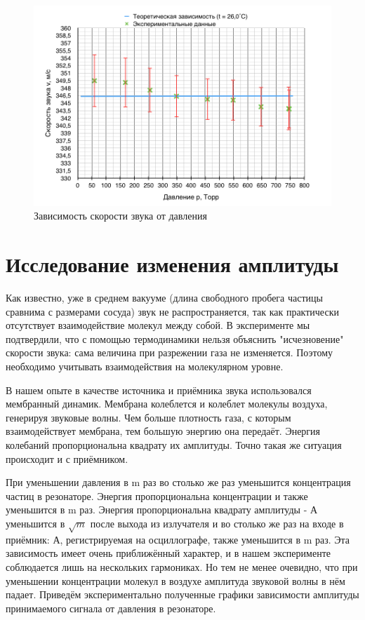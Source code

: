 \documentclass[a4paper,12pt]{article}
\begin{document}
\begin{figure}[h]
    \centering
    \includegraphics[width=\textwidth]{gr_Final.png}
    \caption{Зависимость скорости звука от давления}
    \label{gr:final}
\end{figure}

\section{Исследование изменения амплитуды}

Как известно, уже в среднем вакууме (длина свободного пробега частицы сравнима с размерами сосуда) звук не распространяется, так как практически отсутствует взаимодействие молекул между собой. В эксперименте мы подтвердили, что с помощью термодинамики нельзя объяснить "исчезновение" скорости звука: сама величина при разрежении газа не изменяется. Поэтому необходимо учитывать взаимодействия на молекулярном уровне. \par 
В нашем опыте в качестве источника и приёмника звука использовался мембранный динамик. Мембрана колеблется и колеблет молекулы воздуха, генерируя звуковые волны. Чем больше плотность газа, с которым взаимодействует мембрана, тем большую энергию она передаёт. Энергия колебаний пропорциональна квадрату их амплитуды. Точно такая же ситуация происходит и с приёмником.  \par 
При уменьшении давления в m раз во столько же раз уменьшится концентрация частиц в резонаторе. Энергия пропорциональна концентрации и также уменьшится в m раз. Энергия пропорциональна квадрату амплитуды - А уменьшится в $\sqrt m$ после выхода из излучателя и во столько же раз на входе в приёмник: А, регистрируемая на осциллографе, также уменьшится в m раз. Эта зависимость имеет очень приближённый характер, и в нашем эксперименте соблюдается лишь на нескольких гармониках. Но тем не менее очевидно, что при уменьшении концентрации молекул в воздухе амплитуда звуковой волны в нём падает. Приведём экспериментально полученные графики зависимости амплитуды принимаемого сигнала от давления в резонаторе. \par
\end{document}
